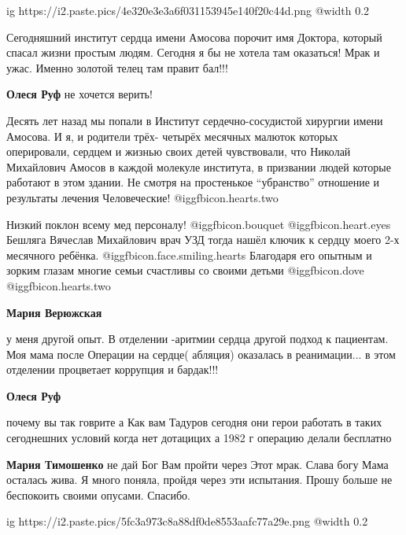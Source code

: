 \begin{itemize}
\ifcmt
  ig https://i2.paste.pics/4e320e3e3a6f031153945e140f20c44d.png
  @width 0.2
\fi


Сегодняшний институт сердца имени Амосова порочит имя Доктора, который спасал
жизни простым людям. Сегодня я бы не хотела там оказаться! Мрак и ужас. Именно
золотой телец там правит бал!!!

\begin{itemize} %
\textbf{Олеся Руф} не хочется верить!

Десять лет назад мы попали в Институт сердечно-сосудистой хирургии имени
Амосова. И я, и родители трёх- четырёх месячных малюток которых оперировали,
сердцем и жизнью своих детей чувствовали, что Николай Михайлович Амосов в
каждой молекуле института, в призвании людей которые работают в этом здании. Не
смотря на простенькое \enquote{убранство} отношение и результаты лечения Человеческие!
 @igg{fbicon.hearts.two} 

Низкий поклон всему мед персоналу!  @igg{fbicon.bouquet}  @igg{fbicon.heart.eyes}  Бешляга Вячеслав Михайлович врач УЗД
тогда нашёл ключик к сердцу моего 2-х месячного ребёнка.  @igg{fbicon.face.smiling.hearts}  Благодаря его
опытным и зорким глазам многие семьи счастливы со своими детьми  @igg{fbicon.dove}  @igg{fbicon.hearts.two} 

\begin{itemize} %
\textbf{Мария Верюжская} 

у меня другой опыт. В отделении -аритмии сердца другой подход к пациентам. Моя
мама после Операции на сердце( абляция) оказалась в реанимации... в этом отделении
процветает коррупция и бардак!!!

\end{itemize} %

\textbf{Олеся Руф} 

почему вы так говрите а Как вам Тадуров сегодня они герои работать в таких
сегоднешних условий когда нет дотацицих а 1982 г операцию делали бесплатно

\textbf{Мария Тимошенко} не дай Бог Вам пройти через
Этот мрак. Слава богу Мама осталась жива. Я много поняла, пройдя через эти испытания. Прошу больше не беспокоить своими опусами. Спасибо.

\end{itemize} %


\ifcmt
  ig https://i2.paste.pics/5fc3a973c8a88df0de8553aafc77a29e.png
  @width 0.2
\fi


\end{itemize}
